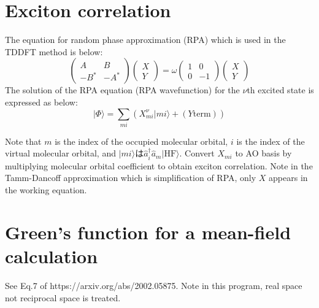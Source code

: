\documentclass{article}
\begin{document}
\section{Exciton correlation}
The equation for random phase approximation (RPA) which is used in the TDDFT method is below:
\begin{equation}
\begin{pmatrix}
A & B \\
-B^* & -A^*
\end{pmatrix}
\begin{pmatrix}
X \\
Y
\end{pmatrix}
= \omega
\begin{pmatrix}
1 & 0 \\
0 & -1
\end{pmatrix}
\begin{pmatrix}
X \\
Y
\end{pmatrix}
\end{equation}
The solution of the RPA equation (RPA wavefunction) for the $\nu$th excited state is expressed as below:
\begin{equation}
|\Phi \rangle = \sum_{mi} (X^{\nu}_{mi}|mi\rangle + (Y \mathrm{term}))
\end{equation}

Note that $m$ is the index of the occupied molecular orbital, $i$ is the index of the virtual molecular orbital,
and $|mi\rangle$は$\hat{a}^{\dagger}_{i}\hat{a}_{m}|\mathrm{HF}\rangle$.
Convert $X_{mi}$ to AO basis by multiplying molecular orbital coefficient to obtain exciton correlation.
Note in the Tamm-Dancoff approximation which is simplification of RPA, only $X$ appears in the working equation.

\section{Green's function for a mean-field calculation}
 See Eq.7 of https://arxiv.org/abs/2002.05875.
 Note in this program, real space not reciprocal space is treated.
\end{document}
